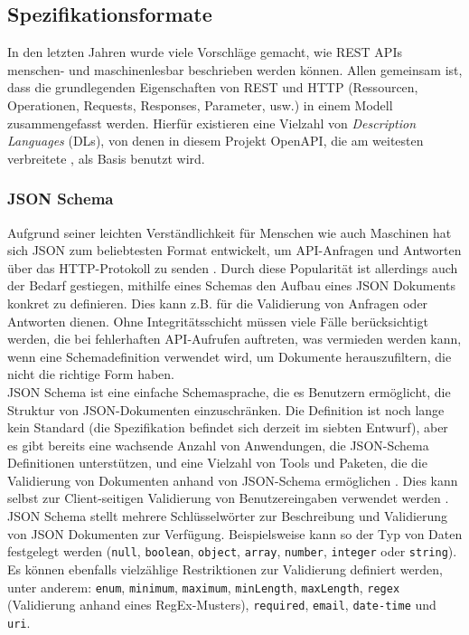 \subsection{Spezifikationsformate}

In den letzten Jahren wurde viele Vorschläge gemacht, wie REST APIs menschen- und maschinenlesbar beschrieben werden können. Allen gemeinsam ist, dass die grundlegenden Eigenschaften von REST und HTTP (Ressourcen, Operationen, Requests, Responses, Parameter, usw.) in einem Modell zusammengefasst werden. Hierfür existieren eine Vielzahl von \emph{Description Languages} (DLs), von denen in diesem Projekt OpenAPI, die am weitesten verbreitete \parencite[38]{scherer2016description}, als Basis benutzt wird.

\subsubsection{JSON Schema}

Aufgrund seiner leichten Verständlichkeit für Menschen wie auch Maschinen hat sich JSON zum beliebtesten Format entwickelt, um API-Anfragen und Antworten über das HTTP-Protokoll zu senden \parencite[263]{pezoa2016foundations}. Durch diese Popularität ist allerdings auch der Bedarf gestiegen, mithilfe eines Schemas den Aufbau eines JSON Dokuments konkret zu definieren. Dies kann z.B. für die Validierung von Anfragen oder Antworten dienen. Ohne Integritätsschicht müssen viele Fälle berücksichtigt werden, die bei fehlerhaften API-Aufrufen auftreten, was vermieden werden kann, wenn eine Schemadefinition verwendet wird, um Dokumente herauszufiltern, die nicht die richtige Form haben. \\

JSON Schema ist eine einfache Schemasprache, die es Benutzern ermöglicht, die Struktur von JSON-Dokumenten einzuschränken. Die Definition ist noch lange kein Standard (die Spezifikation befindet sich derzeit im siebten Entwurf), aber es gibt bereits eine wachsende Anzahl von Anwendungen, die JSON-Schema Definitionen unterstützen, und eine Vielzahl von Tools und Paketen, die die Validierung von Dokumenten anhand von JSON-Schema ermöglichen \parencite[264]{pezoa2016foundations}. Dies kann selbst zur Client-seitigen Validierung von Benutzereingaben verwendet werden \parencite{sturgeon2018validation}. \\

JSON Schema stellt mehrere Schlüsselwörter zur Beschreibung und Validierung von JSON Dokumenten zur Verfügung. Beispielsweise kann so der Typ von Daten festgelegt werden (\lstinline|null|, \lstinline|boolean|, \lstinline|object|, \lstinline|array|, \lstinline|number|, \lstinline|integer| oder \lstinline|string|). Es können ebenfalls vielzählige Restriktionen zur Validierung definiert werden, unter anderem: \lstinline|enum|, \lstinline|minimum|, \lstinline|maximum|, \lstinline|minLength|, \lstinline|maxLength|, \lstinline|regex| (Validierung anhand eines RegEx-Musters), \lstinline|required|, \lstinline|email|, \lstinline|date-time| und \lstinline|uri|. \\

